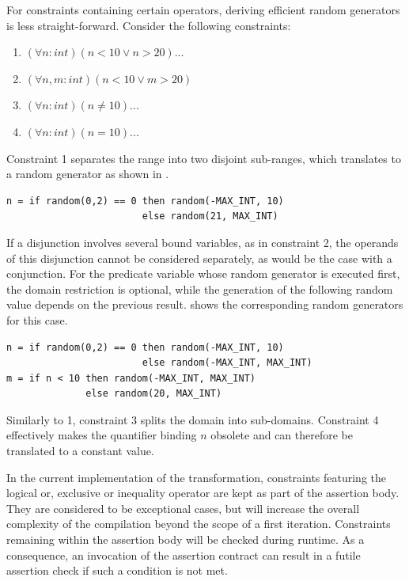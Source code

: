 For constraints containing certain operators, deriving efficient random generators is less straight-forward. Consider the following constraints:
\begin{enumerate}
\itemsep-0.7em
\item $(\forall n : int) (n < 10 \lor n > 20) ...$
\item $(\forall n,m : int) (n < 10 \lor m > 20)$
\item $(\forall n : int) (n \ne 10) ...$
\item $(\forall n : int) (n = 10) ...$
\end{enumerate}
Constraint 1 separates the range into two disjoint sub-ranges, which translates to a random generator as shown in .
\begin{lstlisting}[label=lst:rand_disjoint, caption=Random generator with two disjoint ranges, numbers=none]
n = if random(0,2) == 0 then random(-MAX_INT, 10)
                        else random(21, MAX_INT)
\end{lstlisting}
If a disjunction involves several bound variables, as in constraint 2, the operands of this disjunction cannot be considered separately, as would be the case with a conjunction. For the predicate variable whose random generator is executed first, the domain restriction is optional, while the generation of the following random value depends on the previous result.  shows the corresponding random generators for this case.
\begin{lstlisting}[label=lst:rand_disjoint_nm, caption=Random generators of a disjunction of constraints with two bound variables, numbers=none]
n = if random(0,2) == 0 then random(-MAX_INT, 10)
                        else random(-MAX_INT, MAX_INT)
m = if n < 10 then random(-MAX_INT, MAX_INT)
              else random(20, MAX_INT)
\end{lstlisting}
Similarly to 1, constraint 3 splits the domain into sub-domains. Constraint 4 effectively makes the quantifier binding $n$ obsolete and can therefore be translated to a constant value.

In the current implementation of the transformation, constraints featuring the logical or, exclusive or inequality operator are kept as part of the assertion body. They are considered to be exceptional cases, but will increase the overall complexity of the compilation beyond the scope of a first iteration. Constraints remaining within the assertion body will be checked during runtime. As a consequence, an invocation of the assertion contract can result in a futile assertion check if such a condition is not met.

